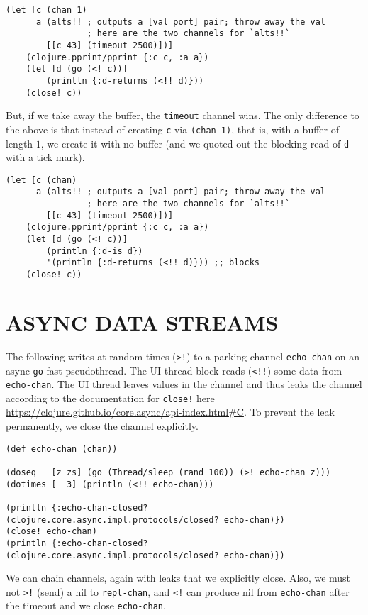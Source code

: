 \documentclass[10pt,oneside,x11names]{article}
\begin{document}
\begin{verbatim}
(let [c (chan 1)
      a (alts!! ; outputs a [val port] pair; throw away the val
                ; here are the two channels for `alts!!`
        [[c 43] (timeout 2500)])]
    (clojure.pprint/pprint {:c c, :a a})
    (let [d (go (<! c))]
        (println {:d-returns (<!! d)}))
    (close! c))
\end{verbatim}

But, if we take away the buffer, the \texttt{timeout} channel wins. The only
difference to the above is that instead of creating \texttt{c} via \texttt{(chan 1)},
that is, with a buffer of length \(1\), we create it with no buffer (and
we quoted out the blocking read of \texttt{d} with a tick mark).

\begin{verbatim}
(let [c (chan)
      a (alts!! ; outputs a [val port] pair; throw away the val
                ; here are the two channels for `alts!!`
        [[c 43] (timeout 2500)])]
    (clojure.pprint/pprint {:c c, :a a})
    (let [d (go (<! c))]
        (println {:d-is d})
        '(println {:d-returns (<!! d)})) ;; blocks
    (close! c))
\end{verbatim}

\section{ASYNC DATA STREAMS}
\label{async-data-streams}
The following writes at random times (\texttt{>!}) to a parking channel
\texttt{echo-chan} on an async \texttt{go} fast pseudothread. The UI thread
block-reads (\texttt{<!!}) some data from \texttt{echo-chan}. The UI thread leaves
values in the channel and thus leaks the channel according to the
documentation for \texttt{close!} here
\url{https://clojure.github.io/core.async/api-index.html\#C}. To prevent the
leak permanently, we close the channel explicitly.

\begin{verbatim}
(def echo-chan (chan))

(doseq   [z zs] (go (Thread/sleep (rand 100)) (>! echo-chan z)))
(dotimes [_ 3] (println (<!! echo-chan)))

(println {:echo-chan-closed? (clojure.core.async.impl.protocols/closed? echo-chan)})
(close! echo-chan)
(println {:echo-chan-closed? (clojure.core.async.impl.protocols/closed? echo-chan)})
\end{verbatim}

We can chain channels, again with leaks that we explicitly close. Also, we must
not \texttt{>!} (send) a nil to \texttt{repl-chan}, and \texttt{<!} can produce nil from \texttt{echo-chan}
after the timeout and we close \texttt{echo-chan}.
\end{document}
